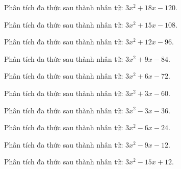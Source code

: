 \begin{bt}
	Phân tích đa thức sau thành nhân tử: $3 x^2 + 18 x - 120$.
\end{bt}
\begin{bt}
	Phân tích đa thức sau thành nhân tử: $3 x^2 + 15 x - 108$.
\end{bt}
\begin{bt}
	Phân tích đa thức sau thành nhân tử: $3 x^2 + 12 x - 96$.
\end{bt}
\begin{bt}
	Phân tích đa thức sau thành nhân tử: $3 x^2 + 9 x - 84$.
\end{bt}
\begin{bt}
	Phân tích đa thức sau thành nhân tử: $3 x^2 + 6 x - 72$.
\end{bt}
\begin{bt}
	Phân tích đa thức sau thành nhân tử: $3 x^2 + 3 x - 60$.
\end{bt}
\begin{bt}
	Phân tích đa thức sau thành nhân tử: $3 x^2 - 3 x - 36$.
\end{bt}
\begin{bt}
	Phân tích đa thức sau thành nhân tử: $3 x^2 - 6 x - 24$.
\end{bt}
\begin{bt}
	Phân tích đa thức sau thành nhân tử: $3 x^2 - 9 x - 12$.
\end{bt}
\begin{bt}
	Phân tích đa thức sau thành nhân tử: $3 x^2 - 15 x + 12$.
\end{bt}
